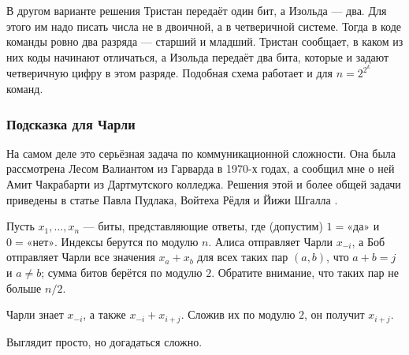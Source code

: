 \begin{addedbytheeditors}
В другом варианте решения Тристан передаёт один бит, а Изольда --- два.
Для этого им надо писать числа не в двоичной, а в четверичной системе.
Тогда в коде команды ровно два разряда --- старший и младший.
Тристан сообщает, в каком из них коды начинают отличаться, а Изольда передаёт два бита, которые и задают четверичную цифру в этом разряде.
Подобная схема работает и для $n = 2^{2^k}$ команд.
\pr
%
%
\end{addedbytheeditors}

\subsubsection*{Подсказка для Чарли}

На самом деле это серьёзная задача по коммуникационной сложности.
Она была рассмотрена Лесом Валиантом из Гарварда в 1970-х годах,
а сообщил мне о ней Амит Чакрабарти из Дартмутского колледжа.
Решения этой и более общей задачи приведены в статье Павла Пудлака, Войтеха Рёдля и Йижи Шгалла \cite{49}.

Пусть $x_1, \dots , x_n$ --- биты, представляющие ответы, где (допустим) $1 = \text{«да»}$ и $0 = \text{«нет»}$.
Индексы берутся по модулю $n$.
Алиса отправляет Чарли $x_{-i}$,
а Боб отправляет Чарли все значения $x_a + x_b$ для всех таких пар $(a, b)$, что $a + b = j$ и $a\ne b$;
сумма битов берётся по модулю $2$.
Обратите внимание, что таких пар не больше $n/2$.

Чарли знает $x_{-i}$, а также $x_{-i} + x_{i+j}$. Сложив их по модулю $2$, он получит $x_{i+j}$.

Выглядит просто, но догадаться сложно.


